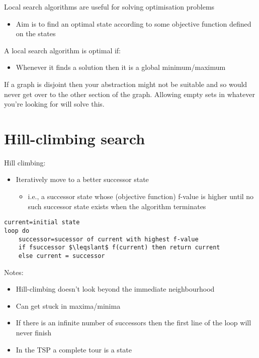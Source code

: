 \documentclass{article}[18pt]
\begin{document}
Local search algorithms are useful for solving optimisation problems
\begin{itemize}
	\item Aim is to find an optimal state according to some objective function defined on the states
\end{itemize}
A local search algorithm is optimal if:
\begin{itemize}
	\item Whenever it finds a solution then it is a global minimum/maximum
\end{itemize}
\begin{important}
If a graph is disjoint then your abstraction might not be suitable and so would never get over to the other section of the graph. Allowing empty sets in whatever you're looking for will solve this.
\end{important}


\section{Hill-climbing search}
Hill climbing:
\begin{itemize}
	\item Iteratively move to a better successor state
	\begin{itemize}
		\item i.e., a successor state whose (objective function) f-value is higher until no such successor state exists when the algorithm terminates
	\end{itemize}
\end{itemize}
\begin{lstlisting}[caption=Hill-climbing]
current=initial state
loop do
	successor=sucessor of current with highest f-value
	if fsuccessor $\leqslant$ f(current) then return current
	else current = successor
\end{lstlisting}
Notes:
\begin{itemize}
	\item Hill-climbing doesn't look beyond the immediate neighbourhood
	\item Can get stuck in maxima/minima
	\item If there is an infinite number of successors then the first line of the loop will never finish
	\item In the TSP a complete tour is a state
\end{itemize}
\end{document}
